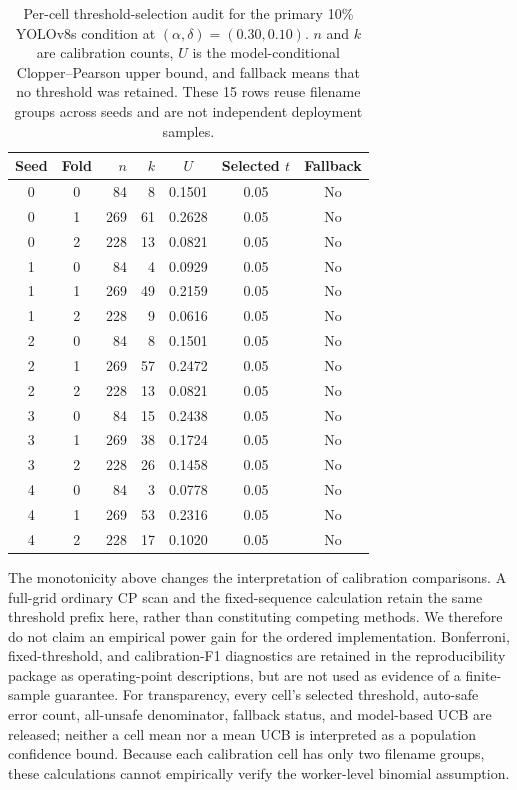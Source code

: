 \documentclass[iicol,pdflatex,sn-mathphys-num]{sn-jnl}
\begin{document}
\begin{table}[t]
\caption{Per-cell threshold-selection audit for the primary 10\% YOLOv8s condition at $(\alpha,\delta)=(0.30,0.10)$. $n$ and $k$ are calibration counts, $U$ is the model-conditional Clopper--Pearson upper bound, and fallback means that no threshold was retained. These 15 rows reuse filename groups across seeds and are not independent deployment samples.}
\label{tab:selectedthresholds}
\centering
\scriptsize
\setlength{\tabcolsep}{5pt}
\begin{tabular}{@{}c c r r c c c@{}}
\toprule
Seed & Fold & $n$ & $k$ & $U$ & Selected $t$ & Fallback \\
\midrule
0 & 0 & 84  & 8  & 0.1501 & 0.05 & No \\
0 & 1 & 269 & 61 & 0.2628 & 0.05 & No \\
0 & 2 & 228 & 13 & 0.0821 & 0.05 & No \\
1 & 0 & 84  & 4  & 0.0929 & 0.05 & No \\
1 & 1 & 269 & 49 & 0.2159 & 0.05 & No \\
1 & 2 & 228 & 9  & 0.0616 & 0.05 & No \\
2 & 0 & 84  & 8  & 0.1501 & 0.05 & No \\
2 & 1 & 269 & 57 & 0.2472 & 0.05 & No \\
2 & 2 & 228 & 13 & 0.0821 & 0.05 & No \\
3 & 0 & 84  & 15 & 0.2438 & 0.05 & No \\
3 & 1 & 269 & 38 & 0.1724 & 0.05 & No \\
3 & 2 & 228 & 26 & 0.1458 & 0.05 & No \\
4 & 0 & 84  & 3  & 0.0778 & 0.05 & No \\
4 & 1 & 269 & 53 & 0.2316 & 0.05 & No \\
4 & 2 & 228 & 17 & 0.1020 & 0.05 & No \\
\bottomrule
\end{tabular}
\end{table}

The monotonicity above changes the interpretation of calibration comparisons. A full-grid ordinary CP scan and the fixed-sequence calculation retain the same threshold prefix here, rather than constituting competing methods. We therefore do not claim an empirical power gain for the ordered implementation. Bonferroni, fixed-threshold, and calibration-F1 diagnostics are retained in the reproducibility package as operating-point descriptions, but are not used as evidence of a finite-sample guarantee. For transparency, every cell's selected threshold, auto-safe error count, all-unsafe denominator, fallback status, and model-based UCB are released; neither a cell mean nor a mean UCB is interpreted as a population confidence bound. Because each calibration cell has only two filename groups, these calculations cannot empirically verify the worker-level binomial assumption.
\end{document}
